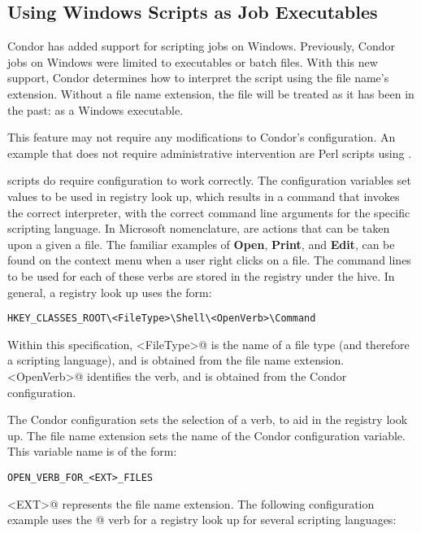 \subsection{\label{sec:windows-scripts-as-executables}Using Windows Scripts as Job Executables}

Condor has added support for scripting jobs on Windows.
Previously, Condor jobs on Windows were limited to executables or batch files.
With this new support,
Condor determines how to interpret the script using 
the file name's extension.
Without a file name extension, 
the file will be treated as it has been in the past:
as a Windows executable.

This feature may not require any modifications to Condor's configuration.  
An example that does not require administrative intervention
are Perl scripts using .

 scripts do require
configuration to work correctly.
The configuration variables set values to be used in registry look up,
which results in a command that invokes the correct interpreter,
with the correct command line arguments for the specific scripting
language.
In Microsoft nomenclature, 
 are actions that can be taken upon a given a file.
The familiar examples of
\textbf{Open}, \textbf{Print}, and \textbf{Edit},
can be found on the context menu when a user right clicks on a file.
The command lines to be used for each of these verbs are stored in
the registry under the  hive.
In general, a registry look up uses the form:

\footnotesize
\begin{verbatim}
HKEY_CLASSES_ROOT\<FileType>\Shell\<OpenVerb>\Command
\end{verbatim}
\normalsize

Within this specification, 
\verb@<FileType>@ is the name of a file type
(and therefore a scripting language),
and is obtained from the file name extension.
\verb@<OpenVerb>@ identifies the verb,
and is obtained from the Condor configuration.

The Condor configuration sets the selection of a verb,
to aid in the registry look up.
The file name extension sets the name of the Condor configuration variable.
This variable name is of the form:
\begin{verbatim}
OPEN_VERB_FOR_<EXT>_FILES
\end{verbatim}
\verb@<EXT>@ represents the file name extension.
The following configuration example uses the @ verb for
a  registry look up for several scripting
languages:

